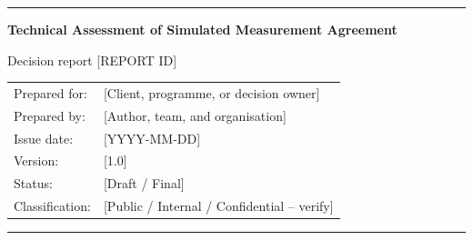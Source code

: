\documentclass[11pt,a4paper]{report}
\begin{document}
\begin{titlepage}
  \color{reportblue}
  \noindent\rule{\textwidth}{2pt}
  \vspace{18mm}
  {\Huge\bfseries Technical Assessment of Simulated Measurement Agreement\par}
  \vspace{8mm}
  {\Large Decision report [REPORT ID]\par}
  \vfill
  \color{black}
  \noindent\begin{tabularx}{\textwidth}{@{}lX@{}}
    Prepared for: & [Client, programme, or decision owner] \\
    Prepared by: & [Author, team, and organisation] \\
    Issue date: & [YYYY-MM-DD] \\
    Version: & [1.0] \\
    Status: & [Draft / Final] \\
    Classification: & [Public / Internal / Confidential -- verify] \\
  \end{tabularx}
  \vfill
  \noindent\rule{\textwidth}{2pt}
\end{titlepage}



\tableofcontents
\listoffigures
\listoftables
\clearpage
{}







\printbibliography[heading=bibintoc,title={References}]
\appendix

\end{document}
